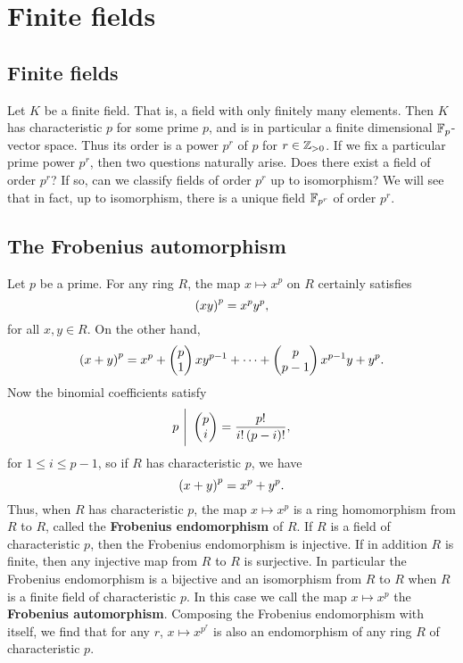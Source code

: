 \pagebreak

\section{Finite fields}


\subsection{Finite fields}

Let $ K $ be a finite field. That is, a field with only finitely many elements. Then $ K $ has characteristic $ p $ for some prime $ p $, and is in particular a finite dimensional $ \mathbb{F}_p $-vector space. Thus its order is a power $ p^r $ of $ p $ for $ r \in \mathbb{Z}_{> 0} $. If we fix a particular prime power $ p^r $, then two questions naturally arise. Does there exist a field of order $ p^r $? If so, can we classify fields of order $ p^r $ up to isomorphism? We will see that in fact, up to isomorphism, there is a unique field $ \mathbb{F}_{p^r} $ of order $ p^r $.

\subsection{The Frobenius automorphism}

Let $ p $ be a prime. For any ring $ R $, the map $ x \mapsto x^p $ on $ R $ certainly satisfies
$$ \left( xy \right)^p = x^py^p, $$
for all $ x, y \in R $. On the other hand,
$$ \left( x + y \right)^p = x^p + \begin{pmatrix} p \\ 1 \end{pmatrix}xy^{p - 1} + \dots + \begin{pmatrix} p \\ p - 1 \end{pmatrix}x^{p - 1}y + y^p. $$
Now the binomial coefficients satisfy
$$ p \ \Bigg| \ \begin{pmatrix} p \\ i \end{pmatrix} = \dfrac{p!}{i!\left( p - i \right)!}, $$
for $ 1 \le i \le p - 1 $, so if $ R $ has characteristic $ p $, we have
$$ \left( x + y \right)^p = x^p + y^p. $$
Thus, when $ R $ has characteristic $ p $, the map $ x \mapsto x^p $ is a ring homomorphism from $ R $ to $ R $, called the \textbf{Frobenius endomorphism} of $ R $. If $ R $ is a field of characteristic $ p $, then the Frobenius endomorphism is injective. If in addition $ R $ is finite, then any injective map from $ R $ to $ R $ is surjective. In particular the Frobenius endomorphism is a bijective and an isomorphism from $ R $ to $ R $ when $ R $ is a finite field of characteristic $ p $. In this case we call the map $ x \mapsto x^p $ the \textbf{Frobenius automorphism}. Composing the Frobenius endomorphism with itself, we find that for any $ r $, $ x \mapsto x^{p^r} $ is also an endomorphism of any ring $ R $ of characteristic $ p $.


